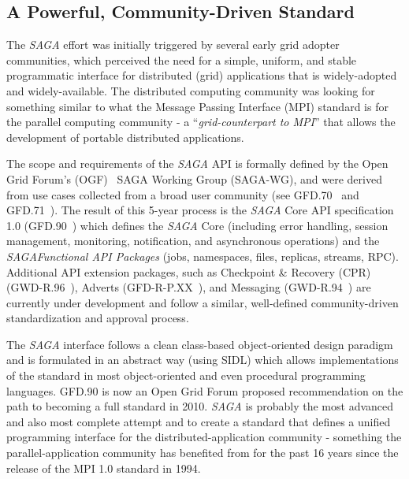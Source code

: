 \documentclass[a4paper,10pt]{article}
\newcommand{\sagaspec}{\textit{SAGA}\xspace}
\newcommand{\spec}{\sagaspec}
\begin{document}
\vspace{-0.8em}

\subsection*{A Powerful, Community-Driven Standard}
\vspace{-0.5em}

 The \spec effort was initially triggered by several early grid
 adopter communities, which perceived the need for a simple, uniform,
 and stable programmatic interface for distributed (grid) applications
 that is widely-adopted and widely-available. The distributed
 computing community was looking for something similar to what the
 Message Passing Interface (MPI) standard is for the parallel
 computing community - a ``\textit{grid-counterpart to MPI}'' that
 allows the development of portable distributed applications.
 
 
 The scope and requirements of the \spec API is formally defined by
 the Open Grid Forum's (OGF)~\cite{ogf} SAGA Working Group (SAGA-WG),
 and were derived from use cases collected from a broad user community
 (see GFD.70~\cite{ogf-gfd-70} and GFD.71~\cite{ogf-gfd-71}). The
 result of this 5-year process is the \spec Core API specification 1.0
 (GFD.90~\cite{ogf-gfd-90}) which defines the \spec Core (including
 error handling, session management, monitoring, notification, and
 asynchronous operations) and the \spec \textit{Functional API
 Packages} (jobs, namespaces, files, replicas, streams, RPC).
 Additional API extension packages, such as Checkpoint \& Recovery
 (CPR) (GWD-R.96~\cite{ogf-gwd-r-96}), Adverts
 (GFD-R-P.XX~\cite{ogf-gwd-r-p-xx}), and Messaging
 (GWD-R.94~\cite{ogf-gwd-r-94}) are currently under development and
 follow a similar, well-defined community-driven standardization and
 approval process. 

 
 The \spec interface follows a clean class-based object-oriented
 design paradigm and is formulated in an abstract way (using SIDL)
 which allows implementations of the standard in most object-oriented
 and even procedural programming languages. GFD.90 is now an Open Grid
 Forum proposed recommendation on the path to becoming a full standard
 in 2010. \spec is probably the most advanced and also most complete
 attempt and to create a standard that defines a unified programming
 interface for the distributed-application community - something the
 parallel-application community has benefited from for the past 16
 years since the release of the MPI 1.0 standard in 1994. 
 
\end{document}
